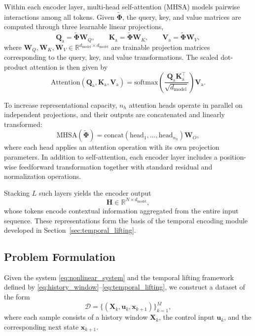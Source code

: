 \documentclass[journal]{IEEEtran}
\newcommand{\vx}{\mathbf{x}}
\newcommand{\vu}{\mathbf{u}}
\newcommand{\mW}{\mathbf{W}}
\newcommand{\mX}{\mathbf{X}}
\newcommand{\mH}{\mathbf{H}}
\newcommand{\mPhi}{\boldsymbol{\Phi}}
\newcommand{\mQa}{\mathbf{Q}_{\mathrm{a}}}
\newcommand{\mKa}{\mathbf{K}_{\mathrm{a}}}
\newcommand{\mVa}{\mathbf{V}_{\mathrm{a}}}
\begin{document}
Within each encoder layer, multi-head self-attention (MHSA) models pairwise interactions among all tokens. Given $\widetilde{\mPhi}$, the query, key, and value matrices are computed through three learnable linear projections,
\begin{equation}
    \mQa = \widetilde{\mPhi}\mW_Q, \qquad
    \mKa = \widetilde{\mPhi}\mW_K, \qquad
    \mVa = \widetilde{\mPhi}\mW_V,
    \label{eq:qkv}
\end{equation}
where $\mW_Q, \mW_K, \mW_V \in \mathbb{R}^{d_{\mathrm{model}} \times d_{\mathrm{model}}}$ are trainable projection matrices corresponding to the query, key, and value transformations. The scaled dot-product attention is then given by
\begin{equation}
    \mathrm{Attention}(\mQa,\mKa,\mVa)
    =
    \mathrm{softmax}\!\left(\frac{\mQa\mKa^\top}{\sqrt{d_{\mathrm{model}}}}\right)\mVa.
    \label{eq:attention}
\end{equation}

To increase representational capacity, $n_h$ attention heads operate in parallel on independent projections, and their outputs are concatenated and linearly transformed:
\begin{equation}
    \mathrm{MHSA}(\widetilde{\mPhi})
    =
    \mathrm{concat}(\mathrm{head}_1,\ldots,\mathrm{head}_{n_h})\mW_O,
    \label{eq:mhsa}
\end{equation}
where each head applies an attention operation with its own projection parameters. In addition to self-attention, each encoder layer includes a position-wise feedforward transformation together with standard residual and normalization operations.

Stacking $L$ such layers yields the encoder output
\begin{equation}
    \mH \in \mathbb{R}^{N \times d_{\mathrm{model}}},
\end{equation}
whose tokens encode contextual information aggregated from the entire input sequence. These representations form the basis of the temporal encoding module developed in Section~\ref{sec:temporal_lifting}.

\subsection{Problem Formulation}
\label{sec:problem}

Given the system \eqref{eq:nonlinear_system} and the temporal lifting framework defined by \eqref{eq:history_window}--\eqref{eq:temporal_lifting}, we construct a dataset of the form
\begin{equation}
    \mathcal{D} = \{(\mX_k, \vu_k, \vx_{k+1})\}_{k=1}^{M},
    \label{eq:dataset}
\end{equation}
where each sample consists of a history window $\mX_k$, the control input $\vu_k$, and the corresponding next state $\vx_{k+1}$. 
\end{document}
